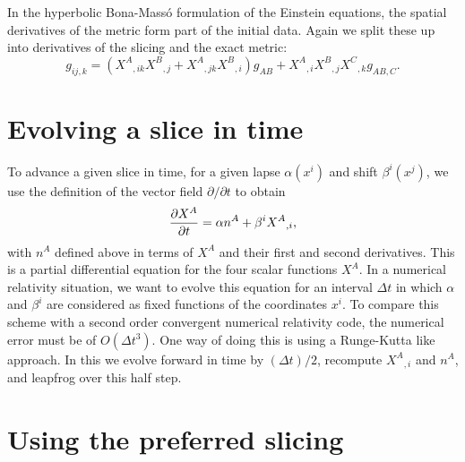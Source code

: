 In the hyperbolic Bona-Mass\'o formulation of the Einstein equations,
the spatial derivatives of the metric form part of the initial
data. Again we split these up into derivatives of the slicing and
the exact metric:
\begin{equation}
g_{ij,k}= \left({X^A}_{,ik} {X^B}_{,j} 
+ {X^A}_{,jk} {X^B}_{,i} \right) g_{AB}+ 
{X^A}_{,i} {X^B}_{,j} {X^C}_{,k}  g_{AB,C}.
\end{equation}


\section{Evolving a slice in time}


To advance a given slice in time, for a given lapse $\alpha(x^i)$ and shift
$\beta^i(x^j)$, we use the definition of the vector field
$\partial/\partial t$ to obtain
\begin{equation}
{\partial  X^A \over\partial t}= \alpha n^A + \beta^i {X^A}_{,i},
\end{equation}
with $n^A$ defined above in terms of $X^A$ and their first and second
derivatives.  This is a partial differential equation for the four
scalar functions $X^A$. In a numerical relativity situation, we want
to evolve this equation for an interval $\Delta t$ in which $\alpha$
and $\beta^i$ are considered as fixed functions of the coordinates
$x^i$. To compare this scheme with a second order convergent numerical
relativity code, the numerical error must be of $O(\Delta t^3)$. One
way of doing this is using a Runge-Kutta like approach. In this we
evolve forward in time by $(\Delta t)/2$, recompute ${X^A}_{,i}$ and
$n^A$, and leapfrog over this half step. 



\section{Using the preferred slicing}


